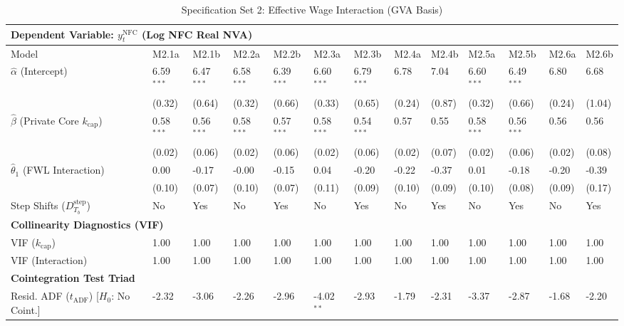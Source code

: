\begin{table}[H]
\centering
\setlength{\tabcolsep}{2.5pt}
\caption{Specification Set 2: Effective Wage Interaction (GVA Basis)}
\label{tab:specA_set2_gva}
\scriptsize
\begin{tabular}{p{3.8cm}p{1.1cm}p{1.1cm}p{1.1cm}p{1.1cm}p{1.1cm}p{1.1cm}p{1.1cm}p{1.1cm}p{1.1cm}p{1.1cm}p{1.1cm}p{1.1cm}}
\toprule
\multicolumn{13}{l}{\textbf{Dependent Variable: $y_t^{\text{NFC}}$ (Log NFC Real NVA)}} \\
\midrule
Model & M2.1a & M2.1b & M2.2a & M2.2b & M2.3a & M2.3b & M2.4a & M2.4b & M2.5a & M2.5b & M2.6a & M2.6b \\
\midrule
$\hat{\alpha}$ (Intercept) & 6.59$^{***}$ & 6.47$^{***}$ & 6.58$^{***}$ & 6.39$^{***}$ & 6.60$^{***}$ & 6.79$^{***}$ & 6.78 & 7.04 & 6.60$^{***}$ & 6.49$^{***}$ & 6.80 & 6.68 \\
 & (0.32) & (0.64) & (0.32) & (0.66) & (0.33) & (0.65) & (0.24) & (0.87) & (0.32) & (0.66) & (0.24) & (1.04) \\
$\hat{\beta}$ (Private Core $k_{\text{cap}}$) & 0.58$^{***}$ & 0.56$^{***}$ & 0.58$^{***}$ & 0.57$^{***}$ & 0.58$^{***}$ & 0.54$^{***}$ & 0.57 & 0.55 & 0.58$^{***}$ & 0.56$^{***}$ & 0.56 & 0.56 \\
 & (0.02) & (0.06) & (0.02) & (0.06) & (0.02) & (0.06) & (0.02) & (0.07) & (0.02) & (0.06) & (0.02) & (0.08) \\
$\hat{\theta}_1$ (FWL Interaction) & 0.00 & -0.17 & -0.00 & -0.15 & 0.04 & -0.20 & -0.22 & -0.37 & 0.01 & -0.18 & -0.20 & -0.39 \\
 & (0.10) & (0.07) & (0.10) & (0.07) & (0.11) & (0.09) & (0.10) & (0.09) & (0.10) & (0.08) & (0.09) & (0.17) \\
Step Shifts ($D_{T_b}^{\text{step}}$) & No & Yes & No & Yes & No & Yes & No & Yes & No & Yes & No & Yes \\
\midrule
\multicolumn{13}{l}{\textbf{Collinearity Diagnostics (VIF)}} \\
VIF ($k_{\text{cap}}$) & 1.00 & 1.00 & 1.00 & 1.00 & 1.00 & 1.00 & 1.00 & 1.00 & 1.00 & 1.00 & 1.00 & 1.00 \\
VIF (Interaction) & 1.00 & 1.00 & 1.00 & 1.00 & 1.00 & 1.00 & 1.00 & 1.00 & 1.00 & 1.00 & 1.00 & 1.00 \\
\midrule
\multicolumn{13}{l}{\textbf{Cointegration Test Triad}} \\
Resid. ADF ($t_{\text{ADF}}$) [$H_0$: No Coint.] & -2.32 & -3.06 & -2.26 & -2.96 & -4.02$^{**}$ & -2.93 & -1.79 & -2.31 & -3.37 & -2.87 & -1.68 & -2.20 \\

\end{tabular}
\end{table}
